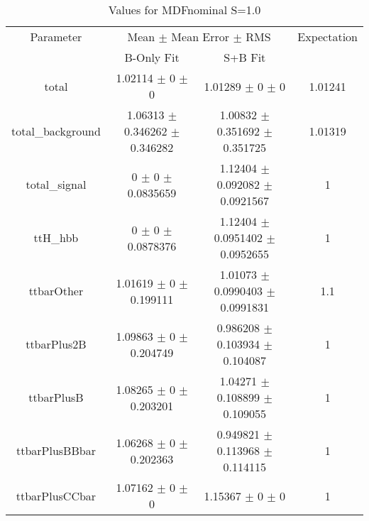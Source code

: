 \begin{table}
\centering
\caption{Values for MDFnominal S=1.0}
\begin{tabular}{cccc}
\toprule
Parameter & \multicolumn{2}{c}{Mean $\pm$ Mean Error $\pm$ RMS} & Expectation\\
 & B-Only Fit & S+B Fit & \\
\midrule
total & \num{1.02114} $\pm$ \num{0} $\pm$ \num{0} & \num{1.01289} $\pm$ \num{0} $\pm$ \num{0} & \num{1.01241}\\
total\_background & \num{1.06313} $\pm$ \num{0.346262} $\pm$ \num{0.346282} & \num{1.00832} $\pm$ \num{0.351692} $\pm$ \num{0.351725} & \num{1.01319}\\
total\_signal & \num{0} $\pm$ \num{0} $\pm$ \num{0.0835659} & \num{1.12404} $\pm$ \num{0.092082} $\pm$ \num{0.0921567} & \num{1}\\
ttH\_hbb & \num{0} $\pm$ \num{0} $\pm$ \num{0.0878376} & \num{1.12404} $\pm$ \num{0.0951402} $\pm$ \num{0.0952655} & \num{1}\\
ttbarOther & \num{1.01619} $\pm$ \num{0} $\pm$ \num{0.199111} & \num{1.01073} $\pm$ \num{0.0990403} $\pm$ \num{0.0991831} & \num{1.1}\\
ttbarPlus2B & \num{1.09863} $\pm$ \num{0} $\pm$ \num{0.204749} & \num{0.986208} $\pm$ \num{0.103934} $\pm$ \num{0.104087} & \num{1}\\
ttbarPlusB & \num{1.08265} $\pm$ \num{0} $\pm$ \num{0.203201} & \num{1.04271} $\pm$ \num{0.108899} $\pm$ \num{0.109055} & \num{1}\\
ttbarPlusBBbar & \num{1.06268} $\pm$ \num{0} $\pm$ \num{0.202363} & \num{0.949821} $\pm$ \num{0.113968} $\pm$ \num{0.114115} & \num{1}\\
ttbarPlusCCbar & \num{1.07162} $\pm$ \num{0} $\pm$ \num{0} & \num{1.15367} $\pm$ \num{0} $\pm$ \num{0} & \num{1}\\
\bottomrule
\end{tabular}
\end{table}
